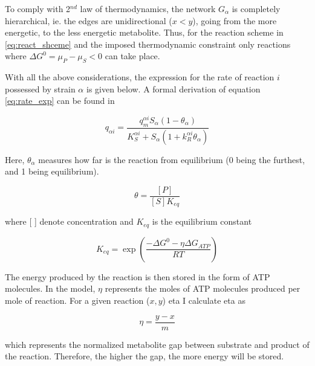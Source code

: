 \documentclass[titlepage,11pt]{article}
\begin{document}
		To comply with 2$ ^{nd} $ law of thermodynamics, the network $ G_{\alpha} $ is completely hierarchical, ie. the edges are unidirectional ($ x < y $), going from the more energetic, to the less energetic metabolite. Thus, for the reaction scheme in \ref{eq:react_shceme} and the imposed thermodynamic constraint only reactions where $ \Delta G^0 = \mu_P - \mu_S < 0 $ can take place.\par
		With all the above considerations, the expression for the rate of reaction $ i $ possessed by strain $ \alpha $ is given below. A formal derivation of equation \ref{eq:rate_exp} can be found in \citet{Hoh2000}
		\begin{linenomath*}	
			\begin{equation}\label{eq:rate_exp}
			q_{\alpha i} = \frac{q_m^{\alpha i}S_{\alpha}(1 - \theta_{\alpha})}{K_S^{\alpha i} + S_{\alpha}(1 + k_R^{\alpha i}\theta_{\alpha})}
			\end{equation}
		\end{linenomath*}
		Here, $ \theta_{\alpha} $ measures how far is the reaction from equilibrium (0 being the furthest, and 1 being equilibrium).
		\begin{linenomath*}	
			\begin{equation}
			\theta = \frac{[P]}{[S]K_{eq}}
			\end{equation}	
		\end{linenomath*}
		where [   ] denote concentration and $ K_{eq} $ is the equilibrium constant
		\begin{linenomath*}	
			\begin{equation}
			K_{eq}= \exp\left(\frac{-\Delta G^{0} - \eta\Delta G_{ATP}}{RT}\right)
			\end{equation}
		\end{linenomath*}
		The energy produced by the reaction is then stored in the form of ATP molecules. In the model, $ \eta $ represents the moles of ATP molecules produced per mole of reaction. For a given reaction ($ x, y $) eta I calculate eta as 
		\begin{linenomath*}	
			\begin{equation}
			\eta = \frac{y - x}{m}
			\end{equation}
		\end{linenomath*}
		which represents the normalized metabolite gap between substrate and product of the reaction. Therefore, the higher the gap, the more energy will be stored.\par
\end{document}
